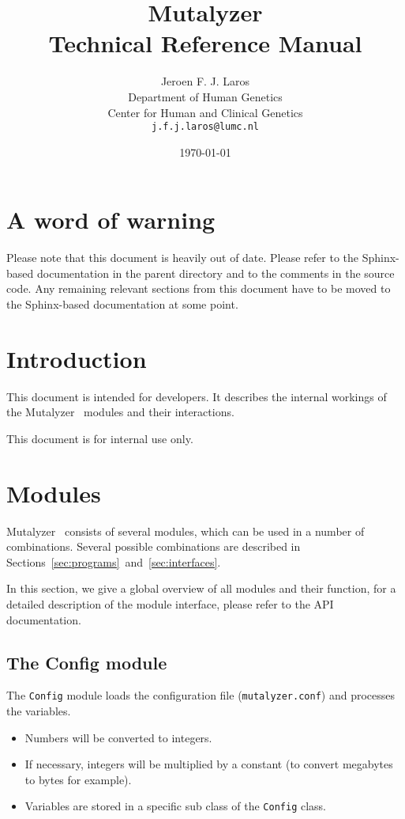 \documentclass{article}
\title{\Huge Mutalyzer \thisversion\\
       Technical Reference Manual}
\author{Jeroen F. J. Laros
        \vspace{10pt}\\
        Department of Human Genetics\\
        Center for Human and Clinical Genetics\\
        \texttt{j.f.j.laros@lumc.nl}}
\date{\today}
\begin{document}
\maketitle
\thispagestyle{empty}
\newpage

\tableofcontents
\newpage


\section{A word of warning} \label{sec:warning}
Please note that this document is heavily out of date. Please refer to the
Sphinx-based documentation in the parent directory and to the comments in the
source code. Any remaining relevant sections from this document have to be
moved to the Sphinx-based documentation at some point.

\newpage

\section{Introduction} \label{sec:introduction}
This document is intended for developers. It describes the internal workings
of the Mutalyzer \thisversion\ modules and their interactions.

This document is for internal use only.

\newpage

\section{Modules} \label{sec:modules}
Mutalyzer \thisversion\ consists of several modules, which can be used in a
number of combinations. Several possible combinations are described in
Sections~\ref{sec:programs}~and~\ref{sec:interfaces}.

In this section, we give a global overview of all modules and their function,
for a detailed description of the module interface, please refer to the
API~\cite{API} documentation.

\subsection{The Config module} \label{subsec:config}
The \texttt{Config} module loads the configuration file
(\texttt{mutalyzer.conf}) and processes the variables.

\begin{itemize}
\item Numbers will be converted to integers.
\item If necessary, integers will be multiplied by a constant (to convert
      megabytes to bytes for example).
\item Variables are stored in a specific sub class of the \texttt{Config}
      class.
\end{itemize}
\end{document}
